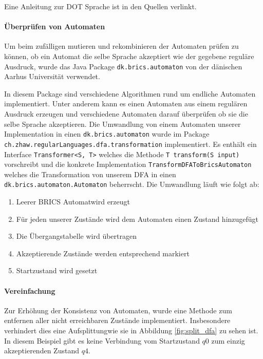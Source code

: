 Eine Anleitung zur DOT Sprache ist in den Quellen verlinkt. \cite{graphvizdotref}

\paragraph{Überprüfen von Automaten}
Um beim zufälligen mutieren und rekombinieren der Automaten prüfen zu können, ob ein Automat die selbe Sprache akzeptiert wie der gegebene reguläre Ausdruck, wurde das Java Package \lstinline$dk.brics.automaton$ von der dänischen Aarhus Universität verwendet.\cite{bricsautomaton}

In diesem Package sind verschiedene Algorithmen rund um endliche Automaten implementiert. Unter anderem kann es einen Automaten aus einem regulären Ausdruck erzeugen und verschiedene Automaten darauf überprüfen ob sie die selbe Sprache akzeptieren. Die Umwandlung von einem Automaten unserer Implementation in einen \lstinline$dk.brics.automaton$ wurde im Package \lstinline$ch.zhaw.regularLanguages.dfa.transformation$ implementiert. Es enthält ein Interface \lstinline$Transformer<S, T>$ welches die Methode \lstinline$T transform(S input)$ vorschreibt und die konkrete Implementation \lstinline$TransformDFAToBricsAutomaton$ welches die Transformation von unserem DFA in einen \lstinline$dk.brics.automaton.Automaton$ beherrscht. Die Umwandlung läuft wie folgt ab:
\begin{enumerate}
  \item Leerer \flqq BRICS Automat\frqq wird erzeugt
  \item Für jeden unserer Zustände wird dem Automaten einen Zustand hinzugefügt
  \item Die Übergangstabelle wird übertragen
  \item Akzeptierende Zustände werden entsprechend markiert
  \item Startzustand wird gesetzt
\end{enumerate}

\paragraph{Vereinfachung}
Zur Erhöhung der Konsistenz von Automaten, wurde eine Methode zum entfernen aller nicht erreichbaren Zustände implementiert. Insbesondere verhindert dies eine \flqq Aufsplittung\frqq wie sie in Abbildung \ref{fig:split_dfa} zu sehen ist. In diesem Beispiel gibt es keine Verbindung vom Startzustand $q0$ zum einzig akzeptierenden Zustand $q4$.

